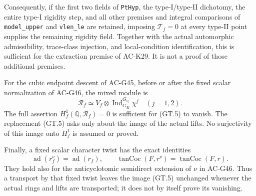 \begin{proposition}
Consequently, if the first two fields of \texttt{PtHyp}, the
type-I/type-II dichotomy, the entire type-I rigidity step,
and all other premises and integral
comparisons of \texttt{model\_upper} and \texttt{vlen\_le} are
retained, imposing $\mathcal T_f=0$ at every type-II point supplies
the remaining rigidity field.  Together with the actual automorphic
admissibility, trace-class injection, and local-condition
identification, this is sufficient for the extraction premise of
AC-K29.  It is not a proof of those additional premises.

For the cubic endpoint descent of AC-G45, before or after the
fixed scalar normalization of AC-G46, the mixed module is
\[
 \mathcal R_f\simeq V_f\otimes
                  \operatorname{Ind}_{G_K}^{G_{\mathbb Q}}\chi^j
       \quad (j=1,2).                                        \tag{GT.7}
\]
The full assertion $H^1_f(\mathbb Q,\mathcal R_f)=0$ is sufficient
for (GT.5) to vanish.  The replacement (GT.5) asks only about the
image of the actual lifts.  No surjectivity of this image onto
$H^1_f$ is assumed or proved.

Finally, a fixed scalar character twist has the exact identities
\[
 \operatorname{ad}(r_f^\nu)=\operatorname{ad}(r_f),\qquad
 \operatorname{tanCoc}(F,r^\nu)=\operatorname{tanCoc}(F,r).
                                                               \tag{GT.8}
\]
They hold also for the anticyclotomic semidirect extension of
$\nu$ in AC-G46.  Thus a transport by that fixed twist leaves
the image (GT.5) unchanged whenever the actual rings and lifts
are transported; it does not by itself prove its vanishing.
\end{proposition}

